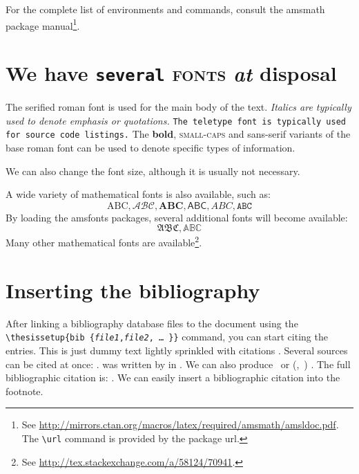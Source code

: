 \documentclass[
  digital,     %
  oneside,     %
  nosansbold,  %
  nocolorbold, %
  lof,         %
  lot,         %
]{fithesis4}
\begin{document}
For the complete list of environments and commands, consult the
\textsf{amsmath} package manual\footnote{
  See \url{http://mirrors.ctan.org/macros/latex/required/amsmath/amsldoc.pdf}.
  The \texttt{\textbackslash url} command is provided by the
  package \textsf{url}.
}.

\chapter{\textnormal{We \textsf{have} \texttt{several} \textsc{fonts}
  \textit{at} \textbf{disposal}}}
The serified roman font is used for the main body of the text.
\textit{Italics are typically used to denote emphasis or
quotations.} \texttt{The teletype font is typically used for source
code listings.} The \textbf{bold}, \textsc{small-caps} and
\textsf{sans-serif} variants of the base roman font can be used to
denote specific types of information.

\tiny We \scriptsize can \footnotesize also \small change \normalsize
the \large font \Large size, \LARGE although \huge it \Huge
is \huge usually \LARGE not \Large necessary.\normalsize

A wide variety of mathematical fonts is also available, such as: \[
  \mathrm{ABC}, \mathcal{ABC}, \mathbf{ABC}, \mathsf{ABC},
  \mathit{ABC}, \mathtt{ABC}
\] By loading the \textsf{amsfonts} packages, several additional
fonts will become available: \[
  \mathfrak{ABC}, \mathbb{ABC}
\] Many other mathematical fonts are available\footnote{
  See \url{http://tex.stackexchange.com/a/58124/70941}.
}.

\chapter{Inserting the bibliography}
After linking a bibliography data\-base files to the document using
the \verb"\"\texttt{thesis\discretionary{-}{}{}setup\{bib\discretionary{=}{=}{=}%
\{\textit{file1},\textit{file2},\,\ldots\,\}\}} command, you can
start citing the entries. This is just dummy text
\parencite{borgman03} lightly sprinkled with citations
\parencite[p.~123]{greenberg98}. Several sources can be cited at
once: \cite{borgman03,greenberg98,thanh01}.
 was written by \citeauthor{greenberg98} in
\citeyear{greenberg98}. We can also produce \textcite{greenberg98}%
\ or %
\def\citeauthoryear#1{(\textcite{#1},~\citeyear{#1})}%
\citeauthoryear{greenberg98}%
. The full bibliographic citation is:
\emph{}. We can easily insert a bibliographic
citation into the footnote.
\end{document}
